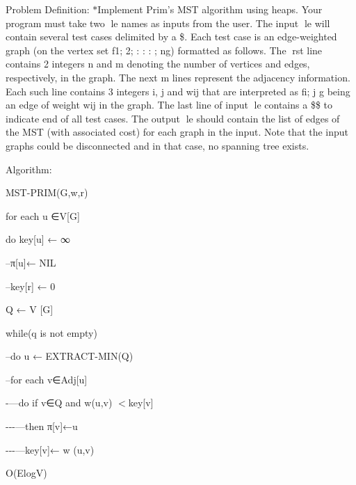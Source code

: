 \begin{DoxyParagraph}{Problem Definition\-:}
$\ast$\-Implement Prim's M\-S\-T algorithm using heaps. Your program must take two le names as inputs from the user. The input le will contain several test cases delimited by a \$. Each test case is an edge-\/weighted graph (on the vertex set f1; 2; \-: \-: \-: ; ng) formatted as follows. The rst line contains 2 integers n and m denoting the number of vertices and edges, respectively, in the graph. The next m lines represent the adjacency information. Each such line contains 3 integers i, j and wij that are interpreted as fi; j g being an edge of weight wij in the graph. The last line of input le contains a \$\$ to indicate end of all test cases. The output le should contain the list of edges of the M\-S\-T (with associated cost) for each graph in the input. Note that the input graphs could be disconnected and in that case, no spanning tree exists.
\end{DoxyParagraph}
\begin{DoxyParagraph}{Algorithm\-:}

\begin{DoxyItemize}
\item M\-S\-T-\/\-P\-R\-I\-M(G,w,r)
\begin{DoxyItemize}
\item for each u ∈\-V\mbox{[}G\mbox{]}
\item do key\mbox{[}u\mbox{]} ← ∞
\item --π\mbox{[}u\mbox{]}← N\-I\-L
\item --key\mbox{[}r\mbox{]} ← 0
\item Q ← V \mbox{[}G\mbox{]}
\item while(q is not empty)
\item --do u ← E\-X\-T\-R\-A\-C\-T-\/\-M\-I\-N(Q)
\item --for each v∈\-Adj\mbox{[}u\mbox{]}
\item -\/---do if v∈\-Q and w(u,v) $<$key\mbox{[}v\mbox{]}
\item -\/-\/-\/---then π\mbox{[}v\mbox{]}←u
\item -\/-\/-\/---key\mbox{[}v\mbox{]}← w (u,v)
\end{DoxyItemize}
\end{DoxyItemize}
\end{DoxyParagraph}
O(\-Elog\-V)

